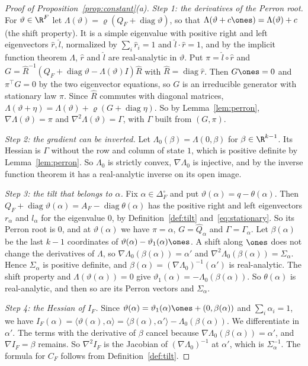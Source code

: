 \begin{proof}[Proof of Proposition~\ref{prop:constant}(a)]
\emph{Step 1: the derivatives of the Perron root.} For $\vartheta\in\R^F$ let
$\Lambda(\vartheta)=\varrho(Q_F+\operatorname{diag}\vartheta)$, so that
$\Lambda(\vartheta+c\ones)=\Lambda(\vartheta)+c$ (the shift property). It is
a simple eigenvalue with positive right and left eigenvectors
$\hat r,\hat l$, normalized by $\sum_i\hat r_i=1$ and $\hat l\cdot\hat r=1$,
and by the implicit function theorem $\Lambda$, $\hat r$ and $\hat l$ are
real-analytic in $\vartheta$. Put $\pi=\hat l\circ\hat r$ and
$G=\hat R^{-1}(Q_F+\operatorname{diag}\vartheta-\Lambda(\vartheta)I)\hat R$
with $\hat R=\operatorname{diag}\hat r$. Then $G\ones=0$ and $\pi^\top G=0$
by the two eigenvector equations, so $G$ is an irreducible generator with
stationary law $\pi$. Since $\hat R$ commutes with diagonal matrices,
$\Lambda(\vartheta+\eta)=\Lambda(\vartheta)+\varrho(G+\operatorname{diag}\eta)$.
So by Lemma~\ref{lem:perron}, $\nabla\Lambda(\vartheta)=\pi$ and
$\nabla^2\Lambda(\vartheta)=\Gamma$, with $\Gamma$ built from $(G,\pi)$.

\emph{Step 2: the gradient can be inverted.} Let
$\Lambda_0(\beta)=\Lambda(0,\beta)$ for $\beta\in\R^{k-1}$. Its Hessian is
$\Gamma$ without the row and column of state $1$, which is positive definite
by Lemma~\ref{lem:perron}. So $\Lambda_0$ is strictly convex,
$\nabla\Lambda_0$ is injective, and by the inverse function theorem it has a
real-analytic inverse on its open image.

\emph{Step 3: the tilt that belongs to $\alpha$.} Fix
$\alpha\in\Delta_F^\circ$ and put $\vartheta(\alpha)=q-\theta(\alpha)$. Then
$Q_F+\operatorname{diag}\vartheta(\alpha)=A_F-\operatorname{diag}\theta(\alpha)$
has the positive right and left eigenvectors $r_\alpha$ and $l_\alpha$ for
the eigenvalue $0$, by Definition~\ref{def:tilt} and~\eqref{eq:stationary}.
So its Perron root is $0$, and at $\vartheta(\alpha)$ we have $\pi=\alpha$,
$G=\widehat Q_\alpha$ and $\Gamma=\Gamma_\alpha$. Let $\beta(\alpha)$ be the
last $k-1$ coordinates of $\vartheta(\alpha)-\vartheta_1(\alpha)\ones$. A
shift along $\ones$ does not change the derivatives of $\Lambda$, so
$\nabla\Lambda_0(\beta(\alpha))=\alpha'$ and
$\nabla^2\Lambda_0(\beta(\alpha))=\Sigma_\alpha$. Hence $\Sigma_\alpha$ is
positive definite, and $\beta(\alpha)=(\nabla\Lambda_0)^{-1}(\alpha')$ is
real-analytic. The shift property and $\Lambda(\vartheta(\alpha))=0$ give
$\vartheta_1(\alpha)=-\Lambda_0(\beta(\alpha))$. So $\theta(\alpha)$ is
real-analytic, and then so are its Perron vectors and $\Sigma_\alpha$.

\emph{Step 4: the Hessian of $I_F$.} Since
$\vartheta(\alpha)=\vartheta_1(\alpha)\ones+(0,\beta(\alpha))$ and
$\sum_i\alpha_i=1$, we have $I_F(\alpha)=\langle\vartheta(\alpha),\alpha\rangle
=\langle\beta(\alpha),\alpha'\rangle-\Lambda_0(\beta(\alpha))$. We
differentiate in $\alpha'$. The terms with the derivative of $\beta$ cancel
because $\nabla\Lambda_0(\beta(\alpha))=\alpha'$, and $\nabla I_F=\beta$
remains. So $\nabla^2I_F$ is the Jacobian of $(\nabla\Lambda_0)^{-1}$ at
$\alpha'$, which is $\Sigma_\alpha^{-1}$. The formula for $C_F$ follows from
Definition~\ref{def:tilt}.
\end{proof}

